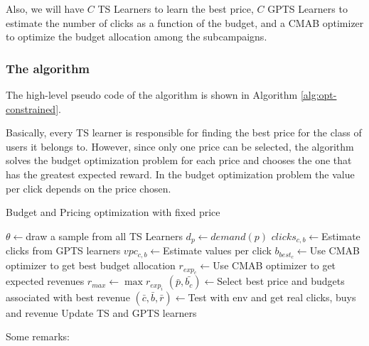 Also, we will have $C$ TS Learners to learn the best price, $C$ GPTS Learners to estimate the number of clicks as a function of the budget, and a CMAB optimizer to optimize the budget allocation among the subcampaigns.

\subsubsection{The algorithm}
The high-level pseudo code of the algorithm is shown in Algorithm \ref{alg:opt-constrained}.

Basically, every TS learner is responsible for finding the best price for the class of users it belongs to.
However, since only one price can be selected, the algorithm solves the budget optimization problem for each price and chooses the one that has the greatest expected reward.
In the budget optimization problem the value per click depends on the price chosen.
\begin{algorithm}
    \caption{Budget and Pricing optimization with fixed price}
    \label{alg:opt-constrained}
	\begin{algorithmic}[1]
        \STATE $\theta\gets ${draw a sample from all TS Learners}
        \STATE $d_p \gets demand(p)$
        \STATE $clicks_{c,b} \gets${Estimate clicks from GPTS learners}
        \STATE $vpc_{c,b}\gets${Estimate values per click}
        \ENDFOR
        \STATE $b_{best_c} \gets${Use CMAB optimizer to get best budget allocation}
        \STATE $r_{exp_c} \gets${Use CMAB optimizer to get expected revenues}
        \ENDFOR
        \ENDFOR
        \STATE $r_{max} \gets \max{r_{exp_i}}$
        \STATE $(\bar{p}, \bar{b_c}) \gets${Select best price and budgets associated with best revenue}
        \STATE $(\bar{c}, \bar{b}, \bar{r}) \gets${Test with env and get real clicks, buys and revenue}
        \STATE Update TS and GPTS learners
        \ENDFOR
        \ENDFOR
	\end{algorithmic}
\end{algorithm}
\newpage Some remarks:
